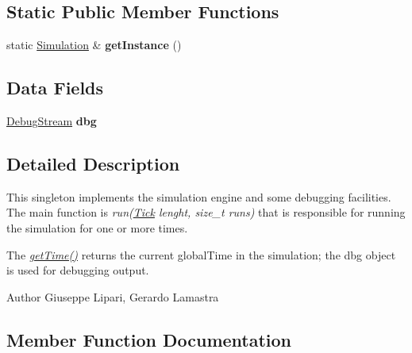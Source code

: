 \subsection*{Static Public Member Functions}
\begin{DoxyCompactItemize}
\item 
static \hyperlink{classMetaSim_1_1Simulation}{Simulation} \& {\bfseries get\+Instance} ()\hypertarget{classMetaSim_1_1Simulation_aff464ebe32d24a847be09df768afbdd4}{}\label{classMetaSim_1_1Simulation_aff464ebe32d24a847be09df768afbdd4}

\end{DoxyCompactItemize}
\subsection*{Data Fields}
\begin{DoxyCompactItemize}
\item 
\hyperlink{classMetaSim_1_1DebugStream}{Debug\+Stream} {\bfseries dbg}\hypertarget{classMetaSim_1_1Simulation_a99e0b432ba6f7b376fd57b892d310df0}{}\label{classMetaSim_1_1Simulation_a99e0b432ba6f7b376fd57b892d310df0}

\end{DoxyCompactItemize}


\subsection{Detailed Description}
This singleton implements the simulation engine and some debugging facilities. The main function is {\itshape run(\hyperlink{classMetaSim_1_1Tick}{Tick} lenght, size\+\_\+t runs)} that is responsible for running the simulation for one or more times.

The {\itshape \hyperlink{classMetaSim_1_1Simulation_ad5d3b77ec77e53d88be1ace99f957e87}{get\+Time()}} returns the current global\+Time in the simulation; the dbg object is used for debugging output.

\begin{DoxyAuthor}{Author}
Giuseppe Lipari, Gerardo Lamastra 
\end{DoxyAuthor}


\subsection{Member Function Documentation}
